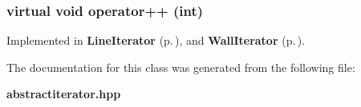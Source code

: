 \subsubsection{\setlength{\rightskip}{0pt plus 5cm}virtual void operator++ (int)\hspace{0.3cm}{\tt  [pure virtual]}}\label{classAbstractIterator_a1}




Implemented in {\bf Line\-Iterator} {\rm (p.\,\pageref{classLineIterator_a2})}, and {\bf Wall\-Iterator} {\rm (p.\,\pageref{classWallIterator_a2})}.

The documentation for this class was generated from the following file:\begin{CompactItemize}
\item 
{\bf abstractiterator.hpp}\end{CompactItemize}
